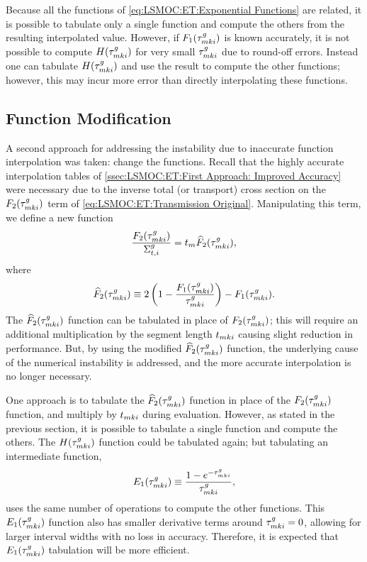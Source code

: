 {{{{        Because all the functions of \cref{eq:LSMOC:ET:Exponential Functions} are related, it is possible to tabulate only a single function and compute the others from the resulting interpolated value.
        However, if $F_1(\segopt)$ is known accurately, it is not possible to compute $H(\segopt)$ for very small $\segopt$ due to round-off errors.
        Instead one can tabulate $H(\segopt)$ and use the result to compute the other functions; however, this may incur more error than directly interpolating these functions.
      }
    }
    \subsection{Function Modification}{\label{ssec:LSMOC:ET:Function Modification}
      A second approach for addressing the instability due to inaccurate function interpolation was taken: change the functions.
      Recall that the highly accurate interpolation tables of \cref{ssec:LSMOC:ET:First Approach: Improved Accuracy} were necessary due to the inverse total (or transport) cross section on the $F_2(\segopt)$ term of \cref{eq:LSMOC:ET:Transmission Original}.
      Manipulating this term, we define a new function
      \begin{equation}\label{eq:LSMOC:ET:F2 Modified Definition}
        \frac{F_2(\segopt)}{\xst} = \nlen\modFunc,
      \end{equation}
      where
      \begin{equation}\label{eq:LSMOC:ET:F2 Modified}
        \modFunc \defined 2\left(1-\frac{F_1(\segopt)}{\segopt}\right) - F_1(\segopt).
      \end{equation}
      The $\modFunc$ function can be tabulated in place of $F_2(\segopt)$; this will require an additional multiplication by the segment length $\nsegl$ causing slight reduction in performance.
      But, by using the modified $\modFunc$ function, the underlying cause of the numerical instability is addressed, and the more accurate interpolation is no longer necessary.

      One approach is to tabulate the $\modFunc$ function in place of the $F_2(\segopt)$ function, and multiply by $\nsegl$ during evaluation.
      However, as stated in the previous section, it is possible to tabulate a single function and compute the others.
      The $H(\segopt)$ function could be tabulated again; but tabulating an intermediate function,
      \begin{equation}\label{eq:LSMOC:ET:E1}
        E_1(\segopt) \defined \frac{1-e^{-\segopt}}{\segopt},
      \end{equation}
      uses the same number of operations to compute the other functions.
      This $E_1(\segopt)$ function also has smaller derivative terms around $\segopt=0$, allowing for larger interval widths with no loss in accuracy.
      Therefore, it is expected that $E_1(\segopt)$ tabulation will be more efficient.
    }
}}
